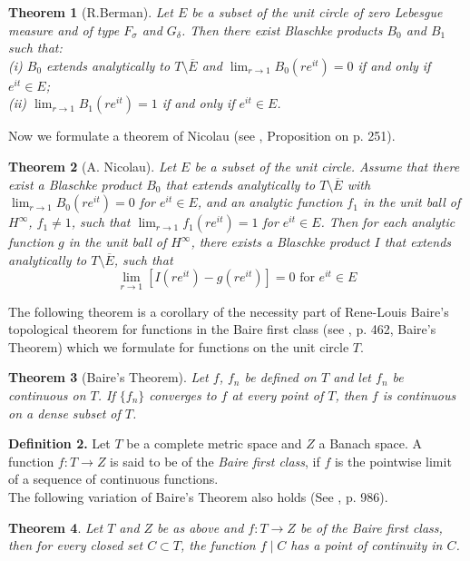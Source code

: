 \documentclass[12pt]{article}
\newtheorem{theorem}{Theorem}
\begin{document}
\begin{theorem}[R.Berman] Let $E$ be a subset of the unit circle of zero Lebesgue measure and of type $F_\sigma$ and $G_\delta$. Then there exist Blaschke products $B_0$ and $B_1$ such that:\\
(i) $B_0$ extends analytically to $T\setminus \overline{E}$ and $\lim_{r\rightarrow 1} B_0(re^{it})=0$ if and only if $e^{it}\in E$;\\
(ii) $\lim_{r\rightarrow 1} B_1(re^{it})=1$ if and only if $e^{it}\in E$.  
\end{theorem}
\noindent Now we formulate a theorem of Nicolau (see \cite{NI}, Proposition on p. 251).
\begin{theorem}[A. Nicolau]
Let $E$ be a subset of the unit circle. Assume that there exist a Blaschke product $B_0$ that extends analytically to $T\setminus \overline{E}$ with $\lim_{r\rightarrow 1}B_0(re^{it})=0$ for $e^{it}\in E$, and an analytic function $f_1$ in the unit ball of $H^\infty$, $f_1\neq 1$, such that $\lim_{r\rightarrow 1}f_1(re^{it})=1$ for $e^{it}\in E$. Then for each analytic function $g$ in the unit ball of $H^\infty$, there exists a Blaschke product $I$ that extends analytically to $T\setminus \overline{E}$, such that $$\lim_{r\rightarrow 1}[I(re^{it})-g(re^{it})]=0 \text{ for } e^{it}\in E$$
\end{theorem}

\noindent The following theorem is a corollary of the necessity part of Rene-Louis Baire's topological theorem for functions in the Baire first class (see \cite{B}, p. 462, Baire's Theorem) which we formulate for functions on the unit circle $T$.


\begin{theorem}[Baire's  Theorem] Let $f$, $f_n$ be defined on $T$ and let $f_n$ be continuous on $T$. If $\lbrace f_n\rbrace$ converges to $f$ at every point of $T$, then $f$ is continuous on a dense subset of $T$.
\end{theorem}


\noindent\textbf{Definition 2.} Let $T$ be a complete metric space and $Z$ a Banach space. A function $f:T\rightarrow Z$ is said to be of the \emph{Baire first class}, if $f$ is the pointwise limit of a sequence of continuous functions.\\

\noindent The following variation of Baire's Theorem also holds (See \cite{S}, p. 986).

\begin{theorem}
Let $T$ and $Z$ be as above and $f:T\rightarrow Z$ be of the Baire first class, then for every closed set $C\subset T$, the function $f\mid C$ has a point of continuity in $C$.
\end{theorem}
\end{document}
